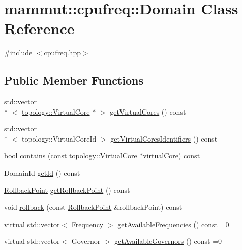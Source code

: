 \hypertarget{classmammut_1_1cpufreq_1_1Domain}{\section{mammut\-:\-:cpufreq\-:\-:Domain Class Reference}
\label{classmammut_1_1cpufreq_1_1Domain}
}


{\ttfamily \#include $<$cpufreq.\-hpp$>$}

\subsection*{Public Member Functions}
\begin{DoxyCompactItemize}
\item 
std\-::vector\\*
$<$ \hyperlink{classmammut_1_1topology_1_1VirtualCore}{topology\-::\-Virtual\-Core} $\ast$ $>$ \hyperlink{classmammut_1_1cpufreq_1_1Domain_a8cbee0022006607f8dad466e0f796768}{get\-Virtual\-Cores} () const 
\item 
std\-::vector\\*
$<$ topology\-::\-Virtual\-Core\-Id $>$ \hyperlink{classmammut_1_1cpufreq_1_1Domain_addbab6bcedcc86a5811dbfe92d0f6dfd}{get\-Virtual\-Cores\-Identifiers} () const 
\item 
bool \hyperlink{classmammut_1_1cpufreq_1_1Domain_a48f7f709c4de763ae757cf792ef20f6c}{contains} (const \hyperlink{classmammut_1_1topology_1_1VirtualCore}{topology\-::\-Virtual\-Core} $\ast$virtual\-Core) const 
\item 
Domain\-Id \hyperlink{classmammut_1_1cpufreq_1_1Domain_a9e704e1fa89206f5238e8cc12eb1c3d0}{get\-Id} () const 
\item 
\hyperlink{structmammut_1_1cpufreq_1_1RollbackPoint}{Rollback\-Point} \hyperlink{classmammut_1_1cpufreq_1_1Domain_a7ce84c12b87b4aabb14686c38f64feae}{get\-Rollback\-Point} () const 
\item 
void \hyperlink{classmammut_1_1cpufreq_1_1Domain_abcd5b9b96fc708cd5456e8856a1b6f8a}{rollback} (const \hyperlink{structmammut_1_1cpufreq_1_1RollbackPoint}{Rollback\-Point} \&rollback\-Point) const 
\item 
virtual std\-::vector$<$ Frequency $>$ \hyperlink{classmammut_1_1cpufreq_1_1Domain_a77f57f47e688a3aaae168a2f9e8dc062}{get\-Available\-Frequencies} () const =0
\item 
virtual std\-::vector$<$ Governor $>$ \hyperlink{classmammut_1_1cpufreq_1_1Domain_ab72f441a05214166a07c4ece122f02c6}{get\-Available\-Governors} () const =0

\end{DoxyCompactItemize}
